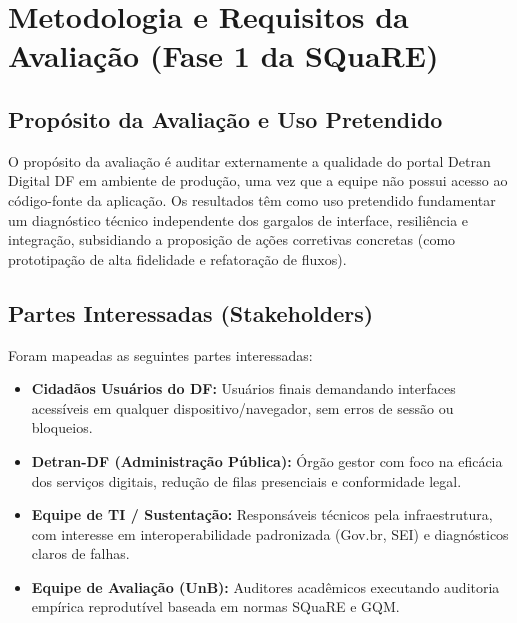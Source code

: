 \documentclass[12pt]{article}
\begin{document}
\section{Metodologia e Requisitos da Avaliação (Fase 1 da SQuaRE)}

\subsection{Propósito da Avaliação e Uso Pretendido}
O propósito da avaliação é auditar externamente a qualidade do portal Detran Digital DF em ambiente de produção, uma vez que a equipe não possui acesso ao código-fonte da aplicação. Os resultados têm como uso pretendido fundamentar um diagnóstico técnico independente dos gargalos de interface, resiliência e integração, subsidiando a proposição de ações corretivas concretas (como prototipação de alta fidelidade e refatoração de fluxos).

\subsection{Partes Interessadas (Stakeholders)}
Foram mapeadas as seguintes partes interessadas:
\begin{itemize}
    \item \textbf{Cidadãos Usuários do DF:} Usuários finais demandando interfaces acessíveis em qualquer dispositivo/navegador, sem erros de sessão ou bloqueios.
    \item \textbf{Detran-DF (Administração Pública):} Órgão gestor com foco na eficácia dos serviços digitais, redução de filas presenciais e conformidade legal.
    \item \textbf{Equipe de TI / Sustentação:} Responsáveis técnicos pela infraestrutura, com interesse em interoperabilidade padronizada (Gov.br, SEI) e diagnósticos claros de falhas.
    \item \textbf{Equipe de Avaliação (UnB):} Auditores acadêmicos executando auditoria empírica reprodutível baseada em normas SQuaRE e GQM.
\end{itemize}
\end{document}

